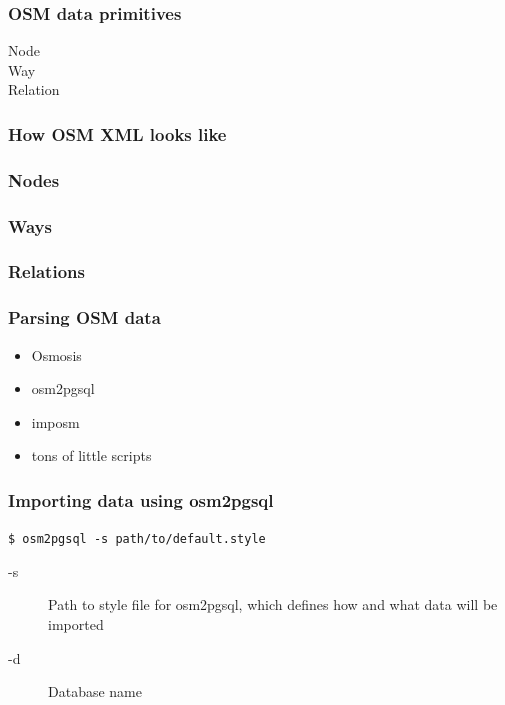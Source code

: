 \documentclass[17pt]{beamer}
\begin{document}
\begin{frame}[t]
  \frametitle{OSM data primitives}
  \begin{description}
  \item[Node] 
  \item[Way] 
  \item[Relation] 
  \end{description}
\end{frame}

\begin{frame}[fragile]
  \frametitle{How OSM XML looks like}
  
\end{frame}

\begin{frame}
  \frametitle{Nodes}
  
\end{frame}

\begin{frame}
  \frametitle{Ways}
  
\end{frame}

\begin{frame}
  \frametitle{Relations}
  
\end{frame}

\begin{frame}
  \frametitle{Parsing OSM data}
  \begin{itemize}
  \item Osmosis
  \item osm2pgsql
  \item imposm
  \item tons of little scripts
  \end{itemize}
\end{frame}

\begin{frame}
  \frametitle{Importing data using osm2pgsql}
  \texttt{\$ osm2pgsql -s path/to/default.style}
  \begin{description}
  \item[-s] Path to style file for osm2pgsql, which defines how and what data will be imported
  \item[-d] Database name
  \end{description}
\end{frame}
\end{document}
